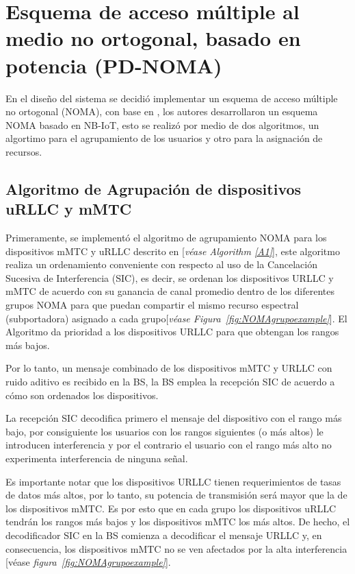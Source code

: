 \break

\section{Esquema de acceso múltiple al medio no ortogonal, basado en potencia (PD-NOMA)}

En el diseño del sistema se decidió implementar un esquema de acceso múltiple no ortogonal (NOMA), con base en \parencite{Shahini2019}, los autores desarrollaron un esquema NOMA basado en NB-IoT, esto se realizó por medio de dos algoritmos, un algortimo para el agrupamiento de los usuarios y otro para la asignación de recursos.

\subsection{Algoritmo de Agrupación de dispositivos uRLLC  y mMTC}

Primeramente, se implementó el algoritmo de agrupamiento NOMA para los dispositivos mMTC y uRLLC descrito en \parencite{Shahini2019}[\textit{véase Algorithm \ref{A1}}], este algoritmo realiza un ordenamiento conveniente con respecto al uso de la Cancelación Sucesiva de Interferencia (SIC), es decir, se ordenan los dispositivos URLLC y mMTC de acuerdo con su ganancia de canal promedio dentro de los diferentes grupos NOMA para que puedan compartir el mismo recurso espectral (subportadora) asignado a cada grupo[\textit{véase Figura~\ref{fig:NOMAgrupoexample}}]. El Algoritmo da prioridad a los dispositivos URLLC para que obtengan los rangos más bajos. \newline

Por lo tanto, un mensaje combinado de los dispositivos mMTC y URLLC con ruido aditivo es recibido en la BS, la BS emplea la recepción SIC de acuerdo a cómo son ordenados los dispositivos. \newline

La recepción SIC decodifica primero el mensaje del dispositivo con el rango más bajo, por consiguiente los usuarios con los rangos siguientes (o más altos) le introducen interferencia y por el contrario el usuario con el rango más alto no experimenta interferencia de ninguna señal.\newline

Es importante notar que los dispositivos URLLC tienen requerimientos de tasas de datos más altos, por lo tanto, su potencia de transmisión será mayor que la de los dispositivos mMTC. Es por esto que en cada grupo los dispositivos uRLLC tendrán los rangos más bajos y los dispositivos mMTC los más altos. De hecho, el decodificador SIC en la BS comienza a decodificar el mensaje URLLC y, en consecuencia, los dispositivos mMTC no se ven afectados por la alta interferencia [véase \textit{figura~\ref{fig:NOMAgrupoexample}}].\newline


